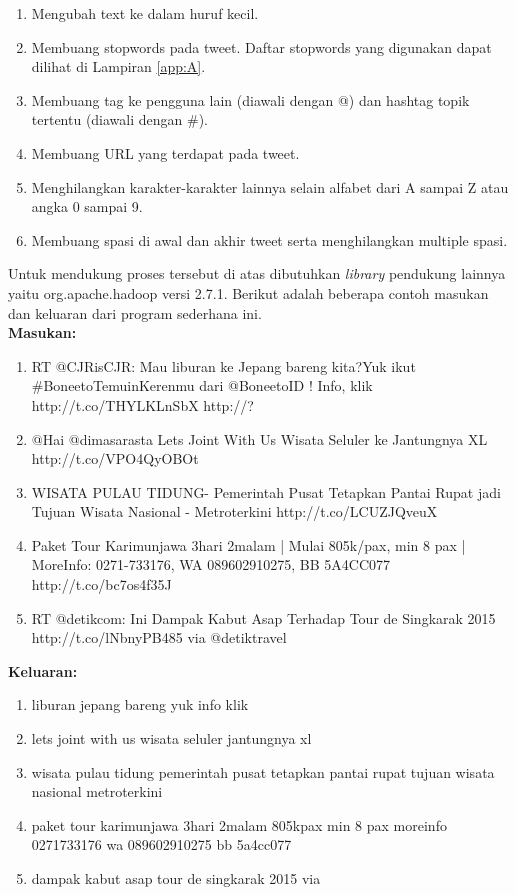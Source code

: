 \begin{enumerate}
	\item Mengubah text ke dalam huruf kecil.
	\item Membuang stopwords pada tweet. Daftar stopwords yang digunakan dapat dilihat di Lampiran \ref{app:A}.
	\item Membuang tag ke pengguna lain (diawali dengan @) dan hashtag topik tertentu (diawali dengan \#).
	\item Membuang URL yang terdapat pada tweet.
	\item Menghilangkan karakter-karakter lainnya selain alfabet dari A sampai Z atau angka 0 sampai 9.
	\item Membuang spasi di awal dan akhir tweet serta menghilangkan multiple spasi.
\end{enumerate}
 
Untuk mendukung proses tersebut di atas dibutuhkan \textit{library} pendukung lainnya yaitu org.apache.hadoop versi 2.7.1. Berikut adalah beberapa contoh masukan dan keluaran dari program sederhana ini.\\
 
     
\textbf{Masukan:}
\begin{enumerate}
	\item RT @CJRisCJR: Mau liburan ke Jepang bareng kita?Yuk ikut \#BoneetoTemuinKerenmu dari @BoneetoID ! Info, klik  http://t.co/THYLKLnSbX http://?
	\item @Hai @dimasarasta  Lets Joint With Us Wisata Seluler ke Jantungnya XL http://t.co/VPO4QyOBOt
	\item WISATA PULAU TIDUNG- Pemerintah Pusat Tetapkan Pantai Rupat jadi Tujuan Wisata Nasional - Metroterkini  http://t.co/LCUZJQveuX
	\item Paket Tour Karimunjawa 3hari 2malam | Mulai 805k/pax, min 8 pax | MoreInfo: 0271-733176, WA 089602910275, BB 5A4CC077 http://t.co/bc7os4f35J
	\item RT @detikcom: Ini Dampak Kabut Asap Terhadap Tour de Singkarak 2015 http://t.co/lNbnyPB485  via @detiktravel
\end{enumerate} 
     
\textbf{Keluaran:}
\begin{enumerate}
	\item liburan jepang bareng yuk info klik 
	\item lets joint with us wisata seluler jantungnya xl
	\item wisata pulau tidung pemerintah pusat tetapkan pantai rupat tujuan wisata nasional metroterkini
	\item paket tour karimunjawa 3hari 2malam 805kpax min 8 pax moreinfo 0271733176 wa 089602910275 bb 5a4cc077
	\item dampak kabut asap tour de singkarak 2015 via
\end{enumerate}

